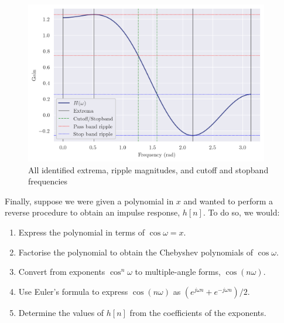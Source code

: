 \newpage

\begin{figure}[ht]
    \centering
    \includegraphics[width=0.95\textwidth]{images/q6_plot_everything.png}
    \caption{All identified extrema, ripple magnitudes, and cutoff and stopband frequencies}
    \label{fig:q6_plot_everything}
\end{figure}

Finally, suppose we were given a polynomial in $x$ and wanted to perform a reverse procedure to obtain an impulse response, $h[n]$. To do so, we would:
\begin{enumerate}
    \item Express the polynomial in terms of $\cos\omega=x$.
    \item Factorise the polynomial to obtain the Chebyshev polynomials of $\cos\omega$.
    \item Convert from exponents $\cos^{n}\omega$ to multiple-angle forms, $\cos(n\omega)$.
    \item Use Euler's formula to express $\cos(n\omega)$ as $(e^{j\omega n} + e^{-j\omega n})/2$.
    \item Determine the values of $h[n]$ from the coefficients of the exponents.
\end{enumerate}
